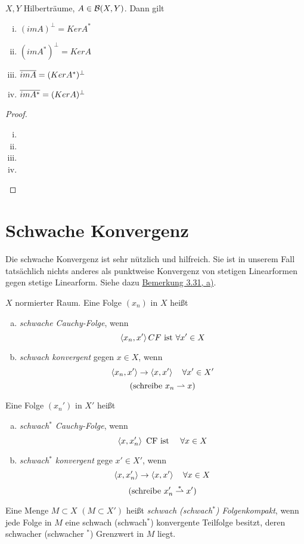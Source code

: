 	\begin{thm}
	\label{3.29}
		$X,Y$ Hilberträume, $A\in \BS$. Dann gilt
			\begin{enumerate}[(i)]
				\item $(imA)^\perp = Ker A^*$
				\item $(imA^*)^\perp = Ker A$
				\item $\overline{imA} = (KerA^*)^\perp$
				\item $\overline{imA^*} = (KerA)^\perp$
			\end{enumerate}
	\end{thm}
	\begin{proof}
		\begin{enumerate}[(i)]
		  \item 
		  \item 
		  \item 
		  \item 
		\end{enumerate}
	\end{proof}
	\section{Schwache Konvergenz}
	\begin{motivation}
	  Die schwache Konvergenz ist sehr nützlich und hilfreich. Sie ist in unserem
		Fall tatsächlich nichts anderes als punktweise Konvergenz von
		stetigen Linearformen gegen stetige Linearform. 
		Siehe dazu \hyperref[bem:3.31]{Bemerkung 3.31, a)}.
	\end{motivation}

	\begin{definition}
	\label{def:3.30}
		$X$ normierter Raum. 
		Eine Folge $(x_n)$ in $X$ heißt 
			\begin{enumerate}[a)]
				\item \textit{schwache Cauchy-Folge}, wenn 
					$$ \left \langle x_n,x' \right \rangle CF \text{ ist }  \forall x' \in X$$
				\item \textit{schwach konvergent} gegen $x\in X$, wenn
					$$ \left \langle x_n, x' \right \rangle \to \left \langle x,x' \right \rangle \quad \forall x' \in X'$$
					$$(\text{schreibe } x_n \rightharpoonup x )$$
			\end{enumerate}
		Eine Folge $(x_n')$ in $X'$ heißt
			\begin{enumerate}[a)]
				\item \textit{schwach$^*$ Cauchy-Folge}, wenn 
					$$ \left \langle x,x_n' \right \rangle \text{ CF ist } \quad \forall x\in X$$
				\item \textit{schwach$^*$ konvergent} gege $x' \in X'$, wenn
					$$ \left \langle x,x_n' \right \rangle \to \left \langle x,x' \right \rangle \quad \forall x\in X $$
					$$(\text{schreibe } x_n' \overset{*}{\rightharpoonup} x')$$
			\end{enumerate}
			Eine Menge $M\subset X$ $(M \subset X')$ heißt \textit{schwach (schwach$^*$) Folgenkompakt}, wenn jede Folge in $M$ eine schwach (schwach$^*$) konvergente Teilfolge besitzt, deren schwacher (schwacher $^*$) Grenzwert in $M$ liegt.
	\end{definition}

